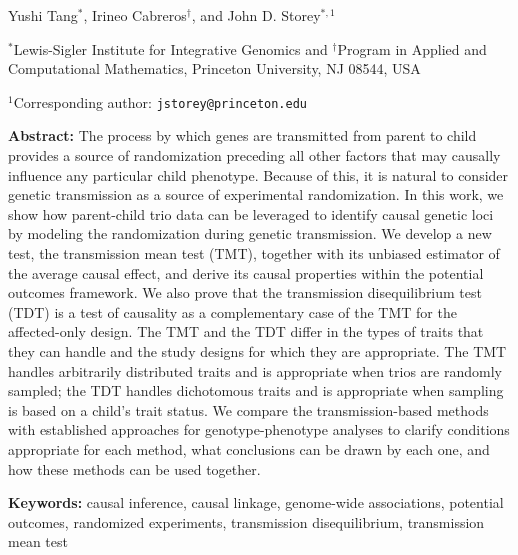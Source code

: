 \documentclass[12pt]{extarticle}
\begin{document}

\thispagestyle{empty}


\vspace{6pt}

\noindent Yushi Tang$^{\ast}$, Irineo Cabreros$^{\dag}$, and John D. Storey$^{\ast, 1}$

\vspace{6pt}
\noindent $^{\ast}$Lewis-Sigler Institute for Integrative Genomics and $^{\dag}$Program in Applied and Computational Mathematics, Princeton University, NJ 08544, USA


\noindent $^{1}$Corresponding author: \texttt{jstorey@princeton.edu}


\vspace{6pt}
\noindent \textbf{Abstract:} The process by which genes are transmitted from parent to child provides a source of randomization preceding all other factors that may causally influence any particular child phenotype. Because of this, it is natural to consider genetic transmission as a source of experimental randomization. In this work, we show how parent-child trio data can be leveraged to identify causal genetic loci by modeling the randomization during genetic transmission. We develop a new test, the transmission mean test (TMT), together with its unbiased estimator of the average causal effect, and derive its causal properties within the potential outcomes framework. We also prove that the transmission disequilibrium test (TDT) is a test of causality as a complementary case of the TMT for the affected-only design. The TMT and the TDT differ in the types of traits that they can handle and the study designs for which they are appropriate. The TMT handles arbitrarily distributed traits and is appropriate when trios are randomly sampled; the TDT handles dichotomous traits and is appropriate when sampling is based on a child's trait status. We compare the transmission-based methods with established approaches for genotype-phenotype analyses to clarify conditions appropriate for each method, what conclusions can be drawn by each one, and how these methods can be used together.   

\vspace{6pt}
\noindent \textbf{Keywords:} causal inference, causal linkage, genome-wide associations, potential outcomes, randomized experiments, transmission disequilibrium, transmission mean test
\end{document}
